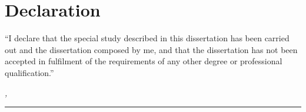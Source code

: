 %
\chapter*{Declaration}
\label{sec:declaration}
\thispagestyle{empty}


``I declare that the special study described in this dissertation has been carried out and the dissertation composed by me, and that the dissertation has not been accepted in fulfilment of the requirements of any other degree or professional qualification.''

\bigskip

\noindent\textit{\thesisUniversityCity, \thesisDate}

\smallskip

\begin{flushright}
	\begin{minipage}{5cm}
		\rule{\textwidth}{1pt}
		\centering\thesisName
	\end{minipage}
\end{flushright}

